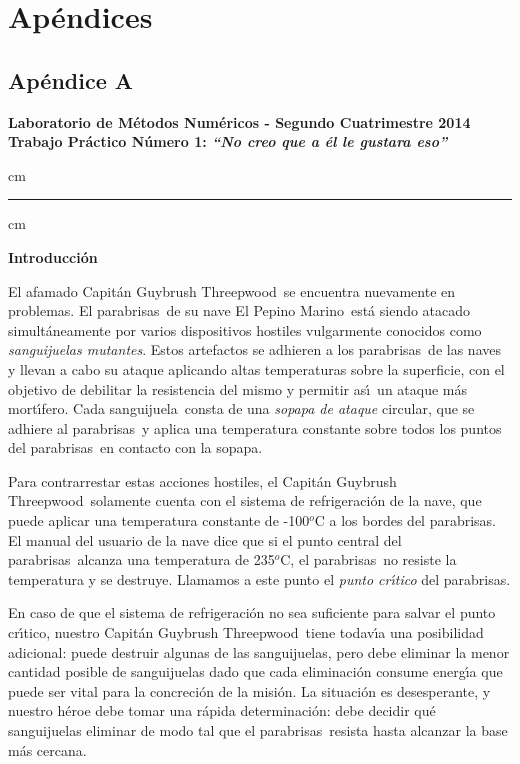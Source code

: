 \documentclass[double, 1.5in, 12pt]{beavtex}
\newcommand{\atacante}{sanguijuela}
\newcommand{\capitan}{Capit\'an Guybrush Threepwood}
\newcommand{\objeto}{parabrisas}
\newcommand{\nave}{El Pepino Marino}
\begin{document}
\chapter{Ap\'endices}

\section{Ap\'endice A}


\begin{centering}
\large\bf Laboratorio de M\'etodos Num\'ericos - Segundo Cuatrimestre 2014 \\
\large\bf Trabajo Pr\'actico N\'umero 1: \emph{``No creo que a \'el le gustara eso''}\\
\end{centering}


 cm
\hrule
{} cm

{\noindent \bf Introducci\'on}

El afamado \capitan\ se encuentra nuevamente en problemas. El
\objeto\ de su nave \nave\ est\'a siendo atacado simult\'aneamente por varios
dispositivos hostiles vulgarmente conocidos como \emph{\atacante s
mutantes}. Estos artefactos se adhieren a los \objeto\ de las naves y
llevan a cabo su ataque aplicando altas temperaturas sobre la superficie, con
el objetivo de debilitar la resistencia del mismo y permitir as\'\i \
un ataque m\'as mort\'\i fero. Cada \atacante\ consta de una \emph{sopapa
de ataque} circular, que se adhiere al \objeto\ y aplica una temperatura
constante sobre todos los puntos del \objeto\ en contacto con la sopapa.

Para con\-tra\-rres\-tar estas acciones hostiles, el \capitan\ 
solamente cuenta con el sistema de refrigeraci\'on de la nave, que puede
aplicar una temperatura constante de -100${}^o$C a los bordes del \objeto.
El manual del usuario de la nave dice que si el punto central del \objeto\ 
alcanza una temperatura de 235${}^o$C, el \objeto\ no resiste la temperatura
y se destruye. Llamamos a este punto el \emph{punto cr\'\i tico} del
\objeto.

En caso de que el sistema de refrigeraci\'on no sea suficiente para salvar
el punto cr\'\i tico, nues\-tro \capitan\ tiene todav\'\i a una posibilidad
adicional: puede des\-tru\-ir algunas de las \atacante s, pero debe eliminar la
menor cantidad posible de \atacante s dado que cada eliminaci\'on consume
energ\'\i a que puede ser vital para la concreci\'on de la misi\'on.
La situaci\'on es desesperante, y nuestro h\'eroe debe tomar una r\'apida
determinaci\'on: debe decidir qu\'e \atacante s eliminar de modo tal que el
\objeto\ resista hasta alcanzar la base m\'as cercana.
\end{document}
